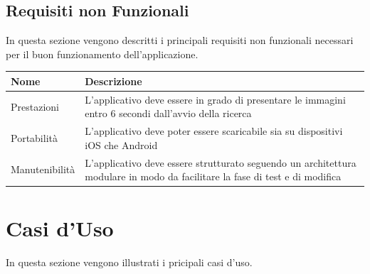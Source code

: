 \subsection{Requisiti non Funzionali}
In questa sezione vengono descritti i principali requisiti non funzionali necessari per il buon funzionamento dell'applicazione.
\begin{center}
    \begin{longtable}{ | l | p{7cm} | }
        \hline
        \textbf{Nome}    & \textbf{Descrizione }                                                                                                       \\ \hline
        Prestazioni      & L'applicativo deve essere in grado di presentare le immagini entro 6 secondi dall'avvio della ricerca                       \\ \hline
        Portabilit\`a    & L'applicativo deve poter essere scaricabile sia su dispositivi iOS che Android                                              \\ \hline
        Manutenibilit\`a & L'applicativo deve essere strutturato seguendo un architettura modulare in modo da facilitare la fase di test e di modifica \\ \hline
    \end{longtable}
\end{center}

\section{Casi d'Uso}

In questa sezione vengono illustrati i pricipali casi d'uso.%
